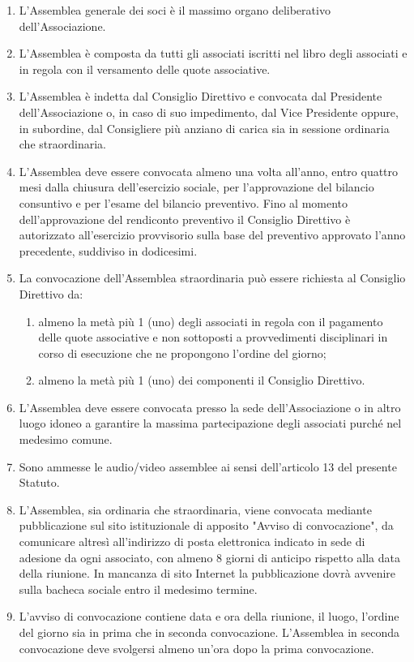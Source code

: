 \documentclass{djtsdoc}
\begin{document}
	\begin{enumerate}
		\item L'Assemblea generale dei soci è il massimo organo deliberativo dell'Associazione.
		\item L'Assemblea è composta da tutti gli associati iscritti nel libro degli associati e in regola con il versamento delle quote associative.
		\item L'Assemblea è indetta dal Consiglio Direttivo e convocata dal Presidente dell'Associazione o, in caso di suo impedimento, dal Vice  Presidente oppure, in subordine, dal Consigliere più anziano di carica sia in sessione ordinaria che straordinaria.
		\item L'Assemblea deve essere convocata almeno una volta all'anno, entro quattro mesi dalla chiusura dell'esercizio sociale, per l'approvazione del bilancio consuntivo e per l'esame del bilancio preventivo. Fino al momento dell'approvazione del rendiconto preventivo il Consiglio Direttivo è autorizzato all'esercizio provvisorio sulla base del preventivo approvato l'anno precedente, suddiviso in dodicesimi.
		\item La convocazione dell'Assemblea straordinaria può essere richiesta al Consiglio Direttivo da:
		\begin{enumerate}
			\item almeno la metà più 1 (uno)  degli associati in regola con il pagamento delle quote associative e non sottoposti a provvedimenti disciplinari in corso di esecuzione che ne propongono l'ordine del giorno;
			\item almeno la metà più 1 (uno) dei componenti il Consiglio Direttivo.
		\end{enumerate}
		\item L'Assemblea deve essere convocata presso la sede dell'Associazione o in altro luogo idoneo a garantire la massima partecipazione degli associati  purché nel  medesimo comune.
		\item Sono ammesse le audio/video assemblee ai sensi dell'articolo 13 del presente Statuto.
		\item L'Assemblea, sia ordinaria che straordinaria, viene convocata mediante pubblicazione sul sito istituzionale di apposito "Avviso di convocazione", da comunicare altresì all'indirizzo di posta elettronica indicato in sede di adesione da ogni associato, con almeno 8 giorni di anticipo rispetto alla data della riunione. In mancanza di sito Internet la pubblicazione dovrà avvenire sulla bacheca sociale entro il medesimo termine.
		\item L'avviso di convocazione contiene data e ora della riunione, il luogo, l'ordine del giorno sia in prima che in seconda convocazione. L'Assemblea in seconda convocazione deve svolgersi almeno un'ora dopo la prima convocazione.

\end{enumerate}
\end{document}
